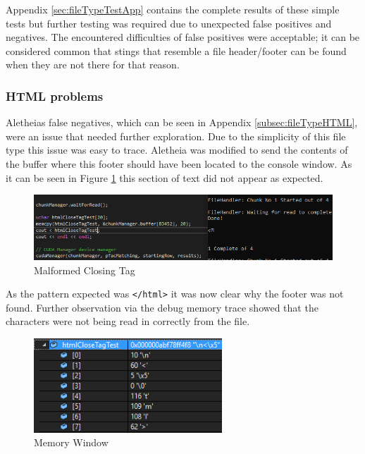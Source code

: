 Appendix \ref{sec:fileTypeTestApp} contains the complete results of these simple tests but further testing was required due to unexpected false positives and negatives.
The encountered difficulties of false positives were acceptable; it can be considered common that stings that resemble a file header/footer can be found when they are not there for that reason.
\newpage
\subsubsection*{HTML problems}
\label{sec:HTMLissue}
Aletheias false negatives, which can be seen in Appendix \ref{subsec:fileTypeHTML}, were an issue that needed further exploration.
Due to the simplicity of this file type this issue was easy to trace.
Aletheia was modified to send the contents of the buffer where this footer should have been located to the console window.
As it can be seen in Figure \ref{fig:BadHTMLCout} this section of text did not appear as expected.

\begin{figure}[!ht]
    \centering
    \includegraphics[width=\linewidth]{Images/Tests/64MB/MalformedClosingtag.png}
    \caption{Malformed Closing Tag}
    \label{fig:BadHTMLCout}
\end{figure}

As the pattern expected was \texttt{</html>} it was now clear why the footer was not found.
Further observation via the debug memory trace showed that the characters were not being read in correctly from the file.

\begin{figure}[!ht]
    \centering
    \includegraphics[width=200pt]{Images/Tests/64MB/MemoryRead.png}
    \caption{Memory Window}
    \label{fig:BadHTMLMem}
\end{figure}

